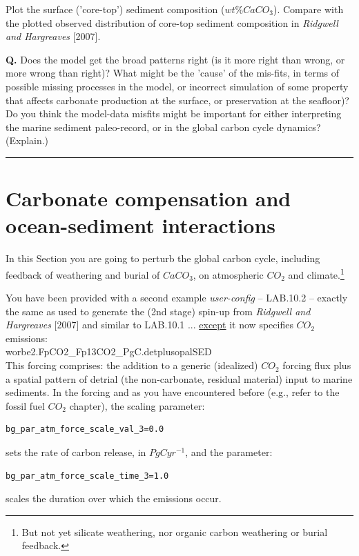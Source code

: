 \noindent Plot the surface ('core-top') sediment composition ($wt\%CaCO_{3}$). Compare with the plotted observed distribution of core-top sediment composition in \textit{Ridgwell and Hargreaves} [2007].

\vspace{1mm}
\noindent \textbf{Q.} Does the model get the broad patterns right (is it more right than wrong, or more wrong than right)? What might be the 'cause' of the mis-fits, in terms of possible missing processes in the model, or incorrect simulation of some property that affects carbonate production at the surface, or preservation at the seafloor)? Do you think the model-data misfits might be important for either interpreting the marine sediment paleo-record, or in the global carbon cycle dynamics? (Explain.)

\vspace{1mm}\noindent\rule{4cm}{0.1mm}\vspace{2mm}

\newpage

\section{Carbonate compensation and ocean-sediment interactions}

In this Section you are going to perturb the global carbon cycle, including feedback of weathering and burial of $CaCO_{3}$, on atmospheric $CO_{2}$ and climate.\footnote{But not yet silicate weathering, nor organic carbon weathering or burial feedback.}

\vspace{1mm}
\noindent You have been provided with a second example \textit{user-config} -- \textsf{\footnotesize LAB.10.2} -- exactly the same as used to generate the (2nd stage) spin-up from \textit{Ridgwell and Hargreaves} [2007] and similar to \textsf{\footnotesize LAB.10.1} ... \uline{except} it now specifies $CO_{2}$ emissions: \\\textsf{\footnotesize worbe2.FpCO2\_Fp13CO2\_PgC.detplusopalSED} \\This forcing comprises: the addition to a generic (idealized) $CO_{2}$ forcing flux plus a spatial pattern of detrial (the non-carbonate, residual material) input to marine sediments. In the forcing and as you have encountered before (e.g., refer to the fossil fuel $CO_{2}$ chapter), the scaling parameter:
\vspace{-1mm}\small\begin{verbatim}
bg_par_atm_force_scale_val_3=0.0
\end{verbatim}\normalsize\vspace{-1mm}
sets the rate of carbon release, in $PgCyr^{-1}$, and the parameter:
\vspace{-1mm}\small\begin{verbatim}
bg_par_atm_force_scale_time_3=1.0
\end{verbatim}\normalsize\vspace{-1mm}
scales the duration over which the emissions occur.

